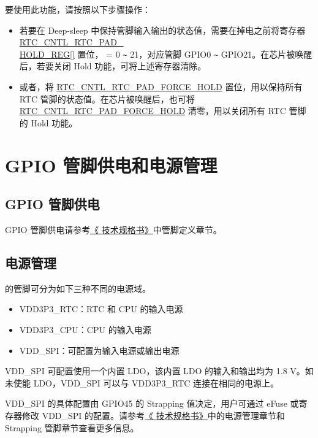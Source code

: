 \documentclass[main\_\_CN.tex]{subfiles}
\begin{document}
\begin{itemize}
要使用此功能，请按照以下步骤操作：

\begin{itemize}
    \item 若要在 Deep-sleep 中保持管脚输入输出的状态值，需要在掉电之前将寄存器 \hyperref[regdesc:RTCCNTLRTCPADHOLDREG]{RTC\_CNTL\_RTC\_PAD\_\\HOLD\_REG[]} 置位， = 0 \verb+~+ 21，对应管脚 GPIO0 \verb+~+ GPIO21。在芯片被唤醒后，若要关闭 Hold 功能，可将上述寄存器清除。
    \item 或者，将 \hyperref[fielddesc:RTCCNTLRTCPADFORCEHOLD]{RTC\_CNTL\_RTC\_PAD\_FORCE\_HOLD} 置位，用以保持所有 RTC 管脚的状态值。在芯片被唤醒后，也可将 \hyperref[fielddesc:RTCCNTLRTCPADFORCEHOLD]{RTC\_CNTL\_RTC\_PAD\_FORCE\_HOLD} 清零，用以关闭所有 RTC 管脚的 Hold 功能。
\end{itemize}

\end{itemize}

\section{GPIO 管脚供电和电源管理}\label{I/O Pad Power Supplies}
\subsection{GPIO 管脚供电}

GPIO 管脚供电请参考\href{https://www.espressif.com/sites/default/files/documentation/esp32-s3_datasheet_cn.pdf}{《\chipname{} 技术规格书》}中管脚定义章节。

\subsection{电源管理}

\chipname{} 的管脚可分为如下三种不同的电源域。
\begin{itemize}
\item VDD3P3\_RTC：RTC 和 CPU 的输入电源
\item VDD3P3\_CPU：CPU 的输入电源
\item VDD\_SPI：可配置为输入电源或输出电源
\end{itemize}

VDD\_SPI 可配置使用一个内置 LDO，该内置 LDO 的输入和输出均为 1.8 V。如未使能 LDO，VDD\_SPI 可以与 VDD3P3\_RTC 连接在相同的电源上。

VDD\_SPI 的具体配置由 GPIO45 的 Strapping 值决定，用户可通过 eFuse 或寄存器修改 VDD\_SPI 的配置。请参考\href{https://www.espressif.com/sites/default/files/documentation/esp32-s3_datasheet_cn.pdf}{《\chipname{} 技术规格书》}中的电源管理章节和 Strapping 管脚章节查看更多信息。
\end{document}

